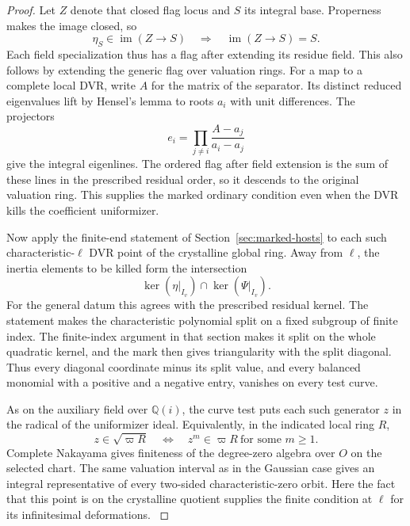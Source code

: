 \begin{proof}
Let \(Z\) denote that closed flag locus and \(S\) its integral base. Properness makes the image closed, so
\[
 \eta_S\in\operatorname{im}(Z\to S)\quad\Longrightarrow\quad\operatorname{im}(Z\to S)=S .
\]
Each field specialization thus has a flag after extending its residue field.
This also follows by extending the
generic flag over valuation rings.
For a map to a complete local DVR, write \(A\) for the
matrix of the separator. Its distinct reduced eigenvalues
lift by Hensel's lemma to roots \(a_i\) with unit differences.
The projectors
\[
                   e_i=\prod_{j\ne i}
                        \frac{A-a_j}{a_i-a_j}
\]
give the integral eigenlines. The ordered flag after field
extension is the sum of these lines in the prescribed residual
order, so it descends to the original valuation ring. This supplies the marked
ordinary condition even when the DVR
kills the coefficient uniformizer.

Now apply the finite-end statement of
Section~\ref{sec:marked-hosts} to
each such characteristic-\(\ell\) DVR
point of the crystalline global ring.
Away from \(\ell\), the inertia elements to be killed form the intersection
\[
 \ker(\eta|_{I_v})\cap\ker(\Psi|_{I_v}) .
\]
For the general datum this agrees with the prescribed residual kernel. The statement
makes the characteristic polynomial
split on a fixed subgroup of finite
index. The finite-index argument in
that section makes it split on the
whole quadratic kernel, and the mark
then gives triangularity with the
split diagonal. Thus every diagonal
coordinate minus its split value, and
every balanced monomial with a
positive and a negative entry, vanishes
on every test curve.

As on the auxiliary field over \(\mathbb Q(i)\), the curve test puts each such generator \(z\) in the radical of the uniformizer ideal. Equivalently, in the indicated local ring \(R\),
\[
 z\in\sqrt{\varpi R}\quad\Longleftrightarrow\quad z^m\in\varpi R\ \text{for some }m\ge1 .
\] Complete Nakayama gives
finiteness of the degree-zero algebra
over \(O\) on the selected chart.
The same valuation interval as in
the Gaussian case gives an integral
representative of every two-sided
characteristic-zero orbit. Here the
fact that this point is on the
crystalline quotient supplies the
finite condition at \(\ell\) for
its infinitesimal deformations.
\label{cor:ordinary-rank-three-length-6}

\end{proof}


